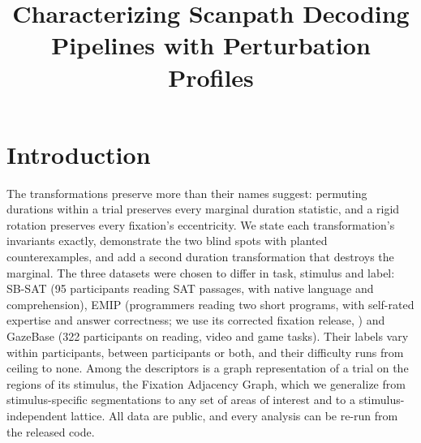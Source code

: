 \documentclass[man,floatsintext,12pt]{apa7}
\title{Characterizing Scanpath Decoding Pipelines with Perturbation Profiles}
\begin{document}
\maketitle

\section{Introduction}


The transformations preserve more than their names suggest: permuting durations within a trial preserves every marginal duration statistic, and a rigid rotation preserves every fixation's eccentricity. We state each transformation's invariants exactly, demonstrate the two blind spots with planted counterexamples, and add a second duration transformation that destroys the marginal. The three datasets were chosen to differ in task, stimulus and label: SB-SAT \citep{ahn2020towards} (95 participants reading SAT passages, with native language and comprehension), EMIP \citep{bednarik2020emip} (programmers reading two short programs, with self-rated expertise and answer correctness; we use its corrected fixation release, \citealp{almadi2021emiptoolkit}) and GazeBase \citep{griffith2021gazebase} (322 participants on reading, video and game tasks). Their labels vary within participants, between participants or both, and their difficulty runs from ceiling to none. Among the descriptors is a graph representation of a trial on the regions of its stimulus, the Fixation Adjacency Graph, which we generalize from stimulus-specific segmentations to any set of areas of interest and to a stimulus-independent lattice. All data are public, and every analysis can be re-run from the released code.


\end{document}
